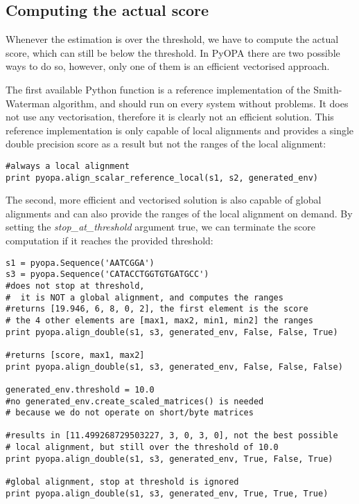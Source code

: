 \documentclass[12pt]{article}
\newcommand{\pp}{PyOPA}
\begin{document}
\subsection{Computing the actual score}
\label{subsec:compAct}

Whenever the estimation is over the threshold, we have to compute the actual score, which can still be below the threshold. In \pp{} there are two possible ways to do so, however, only one of them is an efficient vectorised approach.

The first available Python function is a reference implementation of the Smith-Waterman algorithm, and should run on every system without problems. It does not use any vectorisation, therefore it is clearly not an efficient solution. This reference implementation is only capable of local alignments and provides a single double precision score as a result but not the ranges of the local alignment:

\begin{lstlisting}
#always a local alignment
print pyopa.align_scalar_reference_local(s1, s2, generated_env)
\end{lstlisting}

The second, more efficient and vectorised solution is also capable of global alignments and can also provide the ranges of the local alignment on demand. By setting the \emph{stop\_at\_threshold} argument true, we can terminate the score computation if it reaches the provided threshold:

\begin{lstlisting}
s1 = pyopa.Sequence('AATCGGA')
s3 = pyopa.Sequence('CATACCTGGTGTGATGCC')
#does not stop at threshold,
#  it is NOT a global alignment, and computes the ranges
#returns [19.946, 6, 8, 0, 2], the first element is the score
# the 4 other elements are [max1, max2, min1, min2] the ranges
print pyopa.align_double(s1, s3, generated_env, False, False, True)

#returns [score, max1, max2]
print pyopa.align_double(s1, s3, generated_env, False, False, False)

generated_env.threshold = 10.0
#no generated_env.create_scaled_matrices() is needed
# because we do not operate on short/byte matrices

#results in [11.499268729503227, 3, 0, 3, 0], not the best possible
# local alignment, but still over the threshold of 10.0
print pyopa.align_double(s1, s3, generated_env, True, False, True)

#global alignment, stop at threshold is ignored
print pyopa.align_double(s1, s3, generated_env, True, True, True)
\end{lstlisting}
\end{document}
